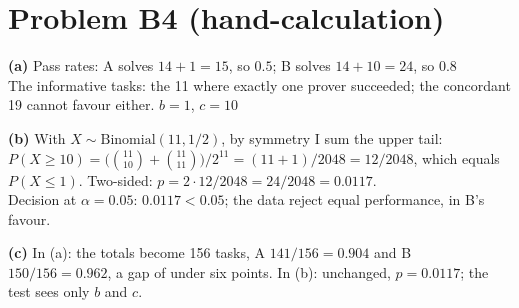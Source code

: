 \documentclass[11pt]{article}
\begin{document}
\section*{Problem B4 (hand-calculation)}\label{ans:B4}
\begin{answer}
\textbf{(a)} Pass rates: A solves $14 + 1 = 15$, so $0.5$; B solves $14 + 10 = 24$,
so $0.8$ \\
The informative tasks: the 11 where exactly one prover succeeded; the
concordant 19 cannot favour either. \quad $b = 1$, $c = 10$

\textbf{(b)} With $X \sim \mathrm{Binomial}(11, 1/2)$, by symmetry I sum the
upper tail: $P(X \geq 10) = \bigl(\binom{11}{10} + \binom{11}{11}\bigr)/2^{11}
= (11 + 1)/2048 = 12/2048$, which equals $P(X \leq 1)$. Two-sided:
$p = 2 \cdot 12/2048 = 24/2048 = 0.0117$. \\
Decision at $\alpha = 0.05$: $0.0117 < 0.05$; the data reject equal
performance, in B's favour.

\textbf{(c)} In (a): the totals become 156 tasks, A $141/156 = 0.904$ and B
$150/156 = 0.962$, a gap of under six points. \quad In (b): unchanged,
$p = 0.0117$; the test sees only $b$ and $c$.
\end{answer}

\end{document}
